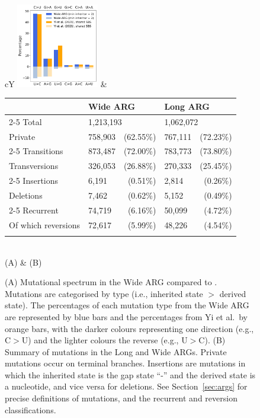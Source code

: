 \documentclass{article}
\begin{document}
\begin{figure} \centering
{}
\begin{tabularx}{\textwidth}{cY}
\hspace*{-2.5mm}\includegraphics[width=0.32\textwidth]{figures/mutational_spectra.pdf}
&
\begin{tabular}[b]{llrlr}\toprule
            & \multicolumn{2}{l}{Wide ARG} & \multicolumn{2}{l}{Long ARG} \\
    \cmidrule{2-5}
Total      & \multicolumn{2}{l}{1,213,193} & \multicolumn{2}{l}{1,062,072} \\
Private     & 758,903 & (62.55\%) &  767,111 & (72.23\%)\\
    \cmidrule{2-5}
Transitions & 873,487   & (72.00\%) & 783,773  & (73.80\%) \\
Transversions & 326,053 & (26.88\%) & 270,333  & (25.45\%) \\
    \cmidrule{2-5}
Insertions  & 6,191  & (0.51\%) & 2,814   & (0.26\%) \\
Deletions   & 7,462  & (0.62\%) & 5,152   & (0.49\%) \\
    \cmidrule{2-5}
Recurrent   & 74,719 & (6.16\%) & 50,099 & (4.72\%) \\
Of which reversions  & 72,617 & (5.99\%) & 48,226 & (4.54\%) \\
\bottomrule
\vspace{-2mm}
\end{tabular}\\
(A) & (B)\\
\end{tabularx}
\caption{\label{fig:mutational_spectra}
(A) Mutational spectrum in
the Wide ARG compared to \cite{Yi2021-sc}. Mutations are
categorised by type (i.e., inherited state $>$ derived state). The percentages
of each mutation type from the Wide ARG are represented by blue bars and the
percentages from Yi et al.\ by orange bars, with the darker colours representing
one direction (e.g., C$>$U) and the lighter colours the reverse (e.g., U$>$C).
(B) Summary of mutations in the Long and Wide ARGs. Private mutations
occur on terminal branches. Insertions are mutations in which the
inherited state is the gap state ``-'' and the derived state is a
nucleotide, and vice versa for deletions. See Section~\ref{sec:args}
for precise definitions of mutations, and the recurrent and reversion
classifications.
}
\end{figure}
\end{document}
